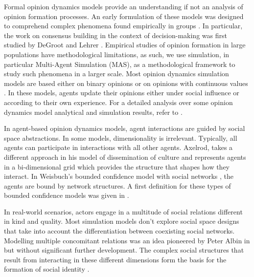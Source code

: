 \documentclass[preprint,number]{elsarticle}
\begin{document}
Formal opinion dynamics models provide an understanding if not an analysis of opinion formation processes.  An early formulation of these models was designed to comprehend complex phenomena found empirically in groups \cite{French1956}. In particular, the work on consensus building in the context of decision-making was first studied by DeGroot \cite{Degroot74} and Lehrer \cite{Lehrer1975}. Empirical studies of opinion formation in large populations have methodological limitations, as such, we use simulation, in particular Multi-Agent Simulation (MAS), as a methodological framework to study such phenomena in a larger scale. Most opinion dynamics simulation models are based either on binary opinions \cite{Galam1997,Antunes2009} or on opinions with continuous values \cite{Deffuant2000,Deffuant2002}. In these models, agents update their opinions either under social influence or according to their own experience. For a detailed analysis over some opinion dynamics model analytical and simulation results, refer to \cite{Hegselmann2002}.

In agent-based opinion dynamics models, agent interactions are guided by social space abstractions. In some models, dimensionality is irrelevant. Typically, all agents can participate in interactions with all other agents. Axelrod, takes a different approach in his model of dissemination of culture \cite{Axelrod1997} and represents agents in a bi-dimensional grid which provides the structure that shapes how they interact. In Weisbuch's bounded confidence model with social networks \cite{Weisbuch2004}, the agents are bound by network structures. A first definition for these types of bounded confidence models was given in \cite{Krause1997}. 

In real-world scenarios, actors engage in a multitude of social relations different in kind and quality. Most simulation models don't explore social space designs that take into account the differentiation between coexisting social networks. Modelling multiple concomitant relations was an idea pioneered by Peter Albin in \cite{Albin1975} but without significant further development. The complex social structures that result from interacting in these different dimensions form the basis for the formation of social identity \cite{Roccas2002,Ellemers2002}.


\end{document}
